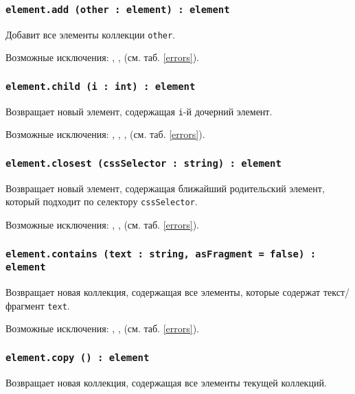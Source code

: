 \subsubsection{\texttt{element.add (other : element) : element}}

Добавит все элементы коллекции \texttt{other}.

Возможные исключения: , ,  (см. таб. \ref{errors}).

\subsubsection{\texttt{element.child (i : int) : element}}

Возвращает новый элемент, содержащая \texttt{i}-й дочерний элемент.

Возможные исключения: , , ,  (см. таб. \ref{errors}).

\subsubsection{\texttt{element.closest (cssSelector : string) : element}}

Возвращает новый элемент, содержащая ближайший родительский элемент, который подходит по селектору \texttt{cssSelector}.

Возможные исключения: , ,  (см. таб. \ref{errors}).

\subsubsection{\texttt{element.contains (text : string, asFragment = false) : element}}

Возвращает новая коллекция, содержащая все элементы, которые содержат текст/фрагмент \texttt{text}.

Возможные исключения: , ,  (см. таб. \ref{errors}).

\subsubsection{\texttt{element.copy () : element}}

Возвращает новая коллекция, содержащая все элементы текущей коллекций.

